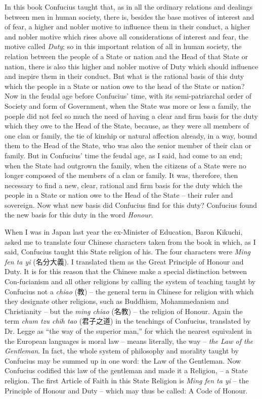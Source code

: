 In this book Confucius taught that, as in all the ordinary relations and dealings between men in human society, there is, besides the base motives of interest and of fear, a higher and nobler motive to influence them in their conduct, a higher and nobler motive which rises above all considerations of interest and fear, the motive called \emph{Duty}; so in this important relation of all in human society, the relation between the people of a State or nation and the Head of that State or nation, there is also this higher and nobler motive of Duty which should influence and inspire them in their conduct. Bnt what is the rational basis of this duty which the people in a State or nation owe to the head of the State or nation? Now in the feudal age before Confucius' time, with its semi-patriarchal order of Society and form of Government, when the State was more or less a family, the poeple did not feel so much the need of having a clear and firm basis for the duty which they owe to the Head of the State, because, as they were all members of one clan or family, the tie of kinship or natural affection already, in a way, bound them to the Head of the State, who was also the senior member of their clan or family. But in Confucius' time the feudal age, as I said, had come to an end; when the State had outgrown the family, when the citizens of a State were no longer composed of the members of a clan or family. It was, therefore, then necessary to find a new, clear, rational and firm basis for the duty which the people in a State or nation owe to the Head of the State --  their ruler and sovereign. Now what new basis did Confucius find for this duty? Confucius found the new basis for this duty in the word \emph{Honour}.

When I was in Japan last year the ex-Minister of Education, Baron Kikuchi, asked me to translate four Chinese characters taken from the book in which, as I said, Confucius taught this State religion of his. The four characters were \emph{Ming fen ta yi} (名分大義).
I translated them as the Great Principle of Honour and Duty. It is for this reason that the Chinese make a special distinction between Con-fucianism and all other religions by calling the system of teaching taught by Confucius not a \emph{chiao} (教) -- the general term in Chinese for religion with which they designate other religions, such as Buddhism, Mohammedanism and Christianity -- but the \emph{ming chiao} (名教) -- the religion of Honour. Again the term \emph{chum tzu chih tao} (君子之道) in the teachings of Confucius, translated by Dr. Legge as ``the way of the superior man,'' for which the nearest equivalent in the European languages is moral law -- means literally, the way -- \emph{the Law of the Gentleman}. In fact, the whole system of philosophy and morality taught by Confucius may be summed up in one word: the Law of the Gentleman. Now Confucius codified this law of the gentleman and made it a Religion,  -- a State religion. The first Article of Faith in this State Religion is \emph{Ming fen ta yi} -- the Principle of Honour and Duty -- which may thus be called: A Code of Honour.

